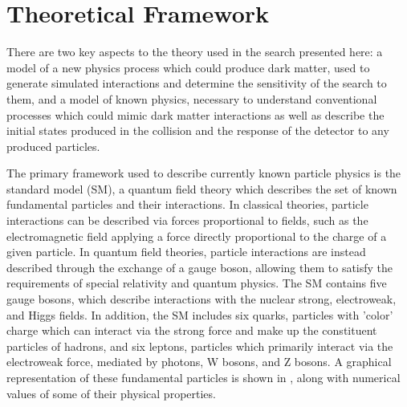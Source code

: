 \chapter{Theoretical Framework}
\label{theory}
There are two key aspects to the theory used in the search presented here: a model of a new physics process which could produce dark matter, used to generate simulated interactions and determine the sensitivity of the search to them, and a model of known physics, necessary to understand conventional processes which could mimic dark matter interactions as well as describe the initial states produced in the collision and the response of the detector to any produced particles.

The primary framework used to describe currently known particle physics is the standard model (SM), a quantum field theory which describes the set of known fundamental particles and their interactions.
In classical theories, particle interactions can be described via forces proportional to fields, such as the electromagnetic field applying a force directly proportional to the charge of a given particle.
In quantum field theories, particle interactions are instead described through the exchange of a gauge boson, allowing them to satisfy the requirements of special relativity and quantum physics. 
The SM contains five gauge bosons, which describe interactions with the nuclear strong, electroweak, and Higgs fields.
In addition, the SM includes six quarks, particles with 'color' charge which can interact via the strong force and make up the constituent particles of hadrons, and six leptons, particles which primarily interact via the electroweak force, mediated by photons, W bosons, and Z bosons.
A graphical representation of these fundamental particles is shown in , along with numerical values of some of their physical properties.

